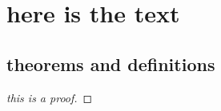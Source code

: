 \section{here is the text}

    \lipsum[3-4]

\subsection{theorems and definitions}
    \lipsum[5-6]

   

    \begin{definition}
        \lipsum[1-2]    
    \end{definition}
    \begin{proposition}
        \lipsum[1-2] 
    \end{proposition}
    \begin{example}
        \lipsum[1-2] 
    \end{example}
    \begin{theorem}
        \lipsum[1-2] 
    \end{theorem}
    \begin{corollary}
        \lipsum[1-2] 
    \end{corollary}
    \begin{question}
        \lipsum[1-2]
    \end{question}
    \begin{conjecture}
        \lipsum[1-2]
    \end{conjecture}
    \begin{exercise}
        \lipsum[1-2]
    \end{exercise}
    \begin{remark}
        \lipsum[1-2]
    \end{remark}
    \begin{proof}[this is a proof]
        \lipsum[1-2]
    \end{proof}
    \begin{lemma}
        \lipsum[1-2]
    \end{lemma}

    \lipsum[100-200] %
